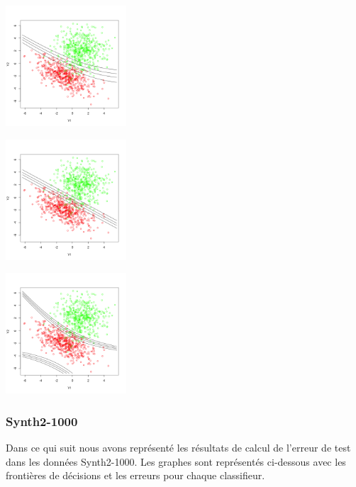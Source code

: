 \documentclass[10pt]{article}
\begin{document}
\begin{center}
	\includegraphics[width=45mm]{Figures/synth1_nb.png}
\end{center}
\begin{minipage}{.5\textwidth}
	\includegraphics[width=45mm]{Figures/synth1_logreg.png}
\end{minipage}%
\hspace{0.02\linewidth}
\begin{minipage}{.5\textwidth}
	\includegraphics[width=45mm]{Figures/synth1_logregquad.png}
\end{minipage}

\subsubsection{Synth2-1000}
Dans ce qui suit nous avons représenté les résultats de calcul de l'erreur de test dans les données Synth2-1000. Les graphes sont représentés ci-dessous avec les frontières de décisions et les erreurs pour chaque classifieur.
\end{document}

